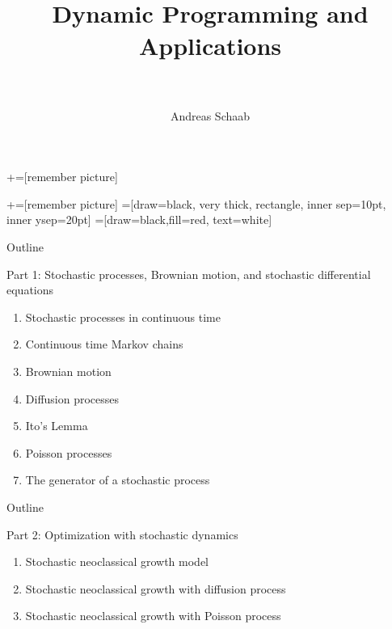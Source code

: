 \documentclass[11pt, aspectratio=169]{beamer}
\title[]{\\[8pt]
	{\large \color{blue} Dynamic Programming and Applications \\[5pt] \normalfont{Applications} \\[10pt] \normalfont{Lecture 7}}}
\author[Schaab]{Andreas Schaab}
\institute{}
\date{}
\begin{document}
+=[remember picture]

\newcommand\marktopleft[1]{%
	\tikz[overlay,remember picture] 
	\node (marker-#1-a) at (-.3em,.3em) {};%
}
\newcommand\markbottomright[2]{%
	\tikz[overlay,remember picture] 
	\node (marker-#1-b) at (0em,0em) {};%
}
+=[remember picture] 
 =[draw=black, very thick, rectangle, inner sep=10pt, inner ysep=20pt]
 =[draw=black,fill=red, text=white]


\addtocounter{framenumber}{-1}
\thispagestyle{empty}
\maketitle 
\newpage




\begin{frame}{Outline}
\thispagestyle{empty}
\addtocounter{framenumber}{-1}

Part 1: Stochastic processes, Brownian motion, and stochastic differential equations
\begin{enumerate}
	\item Stochastic processes in continuous time
	\item Continuous time Markov chains
	\item Brownian motion
	\item Diffusion processes 
	\item Ito's Lemma
	\item Poisson processes
	\item The generator of a stochastic process
\end{enumerate}

\end{frame}


\begin{frame}{Outline}
\thispagestyle{empty}
\addtocounter{framenumber}{-1}

Part 2: Optimization with stochastic dynamics
\begin{enumerate}
	\item Stochastic neoclassical growth model
	\item Stochastic neoclassical growth with diffusion process
	\item Stochastic neoclassical growth with Poisson process
\end{enumerate}

\end{frame}
\end{document}
